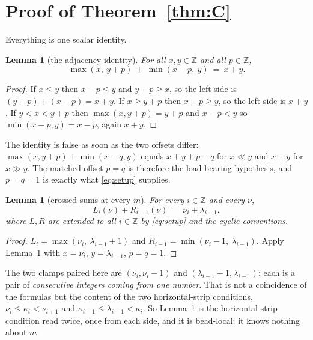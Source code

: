 \documentclass[11pt]{article}
\newtheorem{lemma}[theorem]{Lemma}
\theoremstyle{definition}
\newcommand{\Z}{\mathbb Z}
\begin{document}
\section{Proof of Theorem~\ref{thm:C}}\label{sec:proofC}

Everything is one scalar identity.

\begin{lemma}[the adjacency identity]\label{lem:adj}
For all $x,y\in\Z$ and all $p\in\Z$,
\[
  \max(x,\ y+p)\ +\ \min(x-p,\ y)\ =\ x+y .
\]
\end{lemma}
\begin{proof}
If $x\le y$ then $x-p\le y$ and $y+p\ge x$, so the left side is $(y+p)+(x-p)=x+y$. If
$x\ge y+p$ then $x-p\ge y$, so the left side is $x+y$. If $y<x<y+p$ then
$\max(x,y+p)=y+p$ and $x-p<y$ so $\min(x-p,y)=x-p$, again $x+y$.
\end{proof}

The identity is false as soon as the two offsets differ: $\max(x,y+p)+\min(x-q,y)$ equals
$x+y+p-q$ for $x\ll y$ and $x+y$ for $x\gg y$. The matched offset $p=q$ is therefore the
load-bearing hypothesis, and $p=q=1$ is exactly what \eqref{eq:setup} supplies.

\begin{lemma}[crossed sums at every $m$]\label{lem:crossed}
For every $i\in\Z$ and every $\nu$,
\[
  L_i(\nu)+R_{i-1}(\nu)\ =\ \nu_i+\lambda_{i-1},
\]
where $L,R$ are extended to all $i\in\Z$ by \eqref{eq:setup} and the cyclic conventions.
\end{lemma}
\begin{proof}
$L_i=\max(\nu_i,\ \lambda_{i-1}+1)$ and $R_{i-1}=\min(\nu_i-1,\ \lambda_{i-1})$. Apply
Lemma~\ref{lem:adj} with $x=\nu_i$, $y=\lambda_{i-1}$, $p=q=1$.
\end{proof}

The two clamps paired here are $(\nu_i,\nu_i-1)$ and $(\lambda_{i-1}+1,\lambda_{i-1})$: each
is a pair of \emph{consecutive integers coming from one number}. That is not a coincidence
of the formulas but the content of the two horizontal-strip conditions,
$\nu_i\le\kappa_i<\nu_{i+1}$ and $\kappa_{i-1}\le\lambda_{i-1}<\kappa_i$. So
Lemma~\ref{lem:crossed} is the horizontal-strip condition read twice, once from each side,
and it is bead-local: it knows nothing about $m$.
\end{document}
